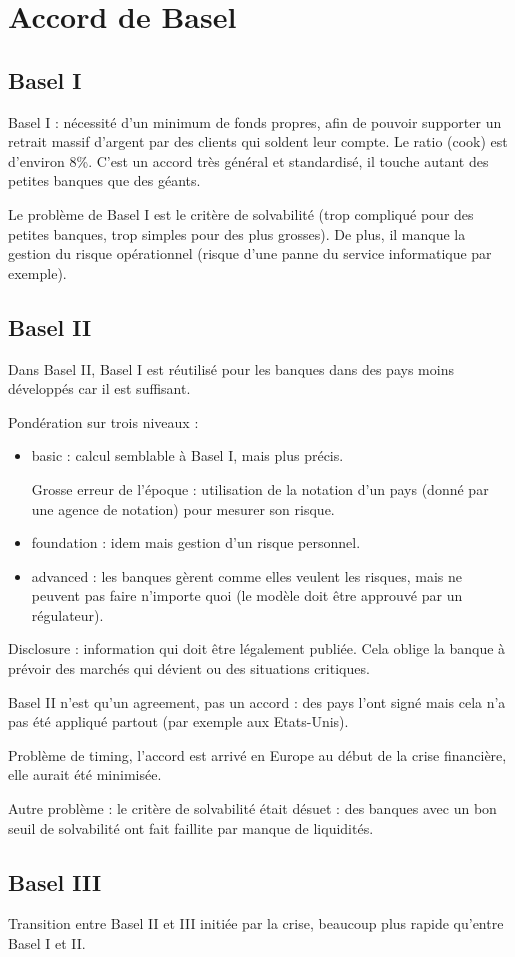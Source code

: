 
\section{Accord de Basel}

\subsection{Basel I}
Basel I : nécessité d'un minimum de fonds propres, afin de pouvoir supporter un retrait massif d'argent par des clients qui soldent leur compte. Le ratio (cook) est d'environ 8\%. C'est un accord très général et standardisé, il touche autant des petites banques que des géants.

Le problème de Basel I est le critère de solvabilité (trop compliqué pour des petites banques, trop simples pour des plus grosses). De plus, il manque la gestion du risque opérationnel (risque d'une panne du service informatique par exemple).

\subsection{Basel II}

Dans Basel II, Basel I est réutilisé pour les banques dans des pays moins développés car il est suffisant.

Pondération sur trois niveaux :

\begin{itemize}
	\item basic : calcul semblable à Basel I, mais plus précis.
	
	Grosse erreur de l'époque : utilisation de la notation d'un pays (donné par une agence de notation) pour mesurer son risque.
	
	\item foundation : idem mais gestion d'un risque personnel.
	\item advanced : les banques gèrent comme elles veulent les risques, mais ne peuvent pas faire n'importe quoi (le modèle doit être approuvé par un régulateur).
\end{itemize}

Disclosure : information qui doit être légalement publiée. Cela oblige la banque à prévoir des marchés qui dévient ou des situations critiques.

Basel II n'est qu'un agreement, pas un accord : des pays l'ont signé mais cela n'a pas été appliqué partout (par exemple aux Etats-Unis).

Problème de timing, l'accord est arrivé en Europe au début de la crise financière, elle aurait été minimisée.

Autre problème : le critère de solvabilité était désuet : des banques avec un bon seuil de solvabilité ont fait faillite par manque de liquidités.

\subsection{Basel III}

Transition entre Basel II et III initiée par la crise, beaucoup plus rapide qu'entre Basel I et II.

